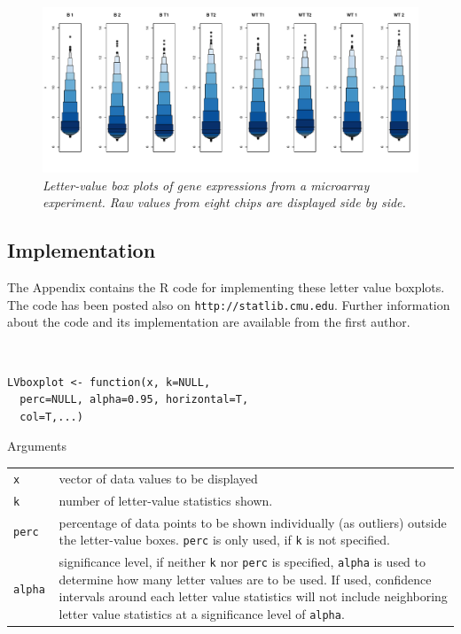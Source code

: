 \documentclass[11pt]{article}
\begin{document}
\begin{figure}[hbt]
\begin{center}
\includegraphics[width=6in]{biotin.pdf}
\caption{\it \label{biotin} Letter-value box plots of gene expressions from a microarray experiment. Raw values from eight chips are displayed side by side.}
\end{center}
\end{figure}

\subsection*{Implementation}

The Appendix contains the R code for implementing these
letter value boxplots.  The code has been posted also on
\texttt{http://statlib.cmu.edu}.
Further information about the code and its implementation
are available from the first author.

{\tt
\begin{verbatim}
LVboxplot <- function(x, k=NULL, 
  perc=NULL, alpha=0.95, horizontal=T, 
  col=T,...) 
\end{verbatim}}

Arguments

\begin{tabular}{lp{2.5in}}
\tt x & vector of data values to be displayed \\
\tt k & number of letter-value statistics shown. \\
\tt perc & percentage of data points to be shown individually 
(as outliers) outside the letter-value boxes. {\tt perc} is only used, 
if {\tt k} is not specified.\\
\tt alpha & significance level, if neither {\tt k} 
nor {\tt perc} is specified, {\tt alpha} is used to determine how 
many letter values are to be used. 
If used, confidence intervals around each letter value statistics 
will not include neighboring letter value statistics at a 
significance level of {\tt alpha}. 
\end{tabular}
\end{document}
